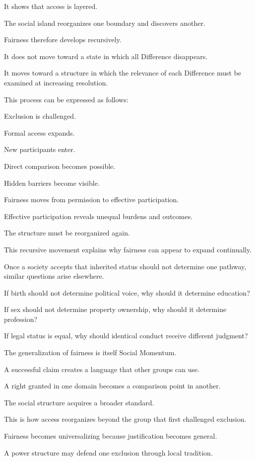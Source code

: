 It shows that access is layered.

The social island reorganizes one boundary and discovers another.

Fairness therefore develops recursively.

It does not move toward a state in which all Difference disappears.

It moves toward a structure in which the relevance of each Difference must be examined at increasing resolution.

This process can be expressed as follows:

Exclusion is challenged.

Formal access expands.

New participants enter.

Direct comparison becomes possible.

Hidden barriers become visible.

Fairness moves from permission to effective participation.

Effective participation reveals unequal burdens and outcomes.

The structure must be reorganized again.

This recursive movement explains why fairness can appear to expand continually.

Once a society accepts that inherited status should not determine one pathway, similar questions arise elsewhere.

If birth should not determine political voice, why should it determine education?

If sex should not determine property ownership, why should it determine profession?

If legal status is equal, why should identical conduct receive different judgment?

The generalization of fairness is itself Social Momentum.

A successful claim creates a language that other groups can use.

A right granted in one domain becomes a comparison point in another.

The social structure acquires a broader standard.

This is how access reorganizes beyond the group that first challenged exclusion.

Fairness becomes universalizing because justification becomes general.

A power structure may defend one exclusion through local tradition.

